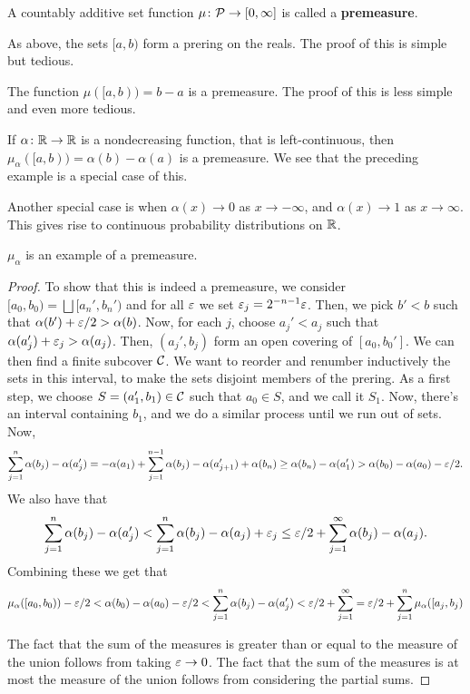 \begin{definition}
    A countably additive set function $\mu \colon \mathcal P \to [0, \infty]$ is called a \textbf{premeasure}.
\end{definition}

\begin{example}
    As above, the sets $[a, b)$ form a prering on the reals. The proof of this is simple but tedious.

    The function $\mu([a, b)) = b - a$ is a premeasure. The proof of this is less simple and even more tedious.
\end{example}

\begin{example}
    If $\alpha \colon \mathbb R \to \mathbb R$ is a nondecreasing function, that is left-continuous, then $\mu_\alpha([a, b)) = \alpha(b) - \alpha(a)$ is a premeasure. We see that the preceding example is a special case of this.

    Another special case is when $\alpha(x) \to 0$ as $x \to -\infty$, and $\alpha(x) \to 1$ as $x \to \infty.$ This gives rise to continuous probability distributions on $\mathbb R$.
\end{example}

\begin{proposition}
    $\mu_\alpha$ is an example of a premeasure.
\end{proposition}

\begin{proof}
    To show that this is indeed a premeasure, we consider $[a_0, b_0) = \bigsqcup [a_n', b_n')$ and for all $\varepsilon$ we set $\varepsilon_j = 2^{-n - 1}\varepsilon$. Then, we pick $b' < b$ such that $\alpha(b') + \varepsilon/2 > \alpha(b)$. Now, for each $j$, choose $a_j' < a_j$ such that $\alpha(a_j') + \varepsilon_j > \alpha(a_j)$. Then, $(a_j', b_j)$ form an open covering of $[a_0, b_0']$. We can then find a finite subcover $\mathcal C$. We want to reorder and renumber inductively the sets in this interval, to make the sets disjoint members of the prering. As a first step, we choose $S = (a_1', b_1) \in \mathcal C$ such that $a_0 \in S$, and we call it $S_1$. Now, there's an interval containing $b_1$, and we do a similar process until we run out of sets. Now, \[\sum_{j = 1}^n \alpha(b_j) - \alpha(a_j') = -\alpha(a_1) + \sum_{j = 1}^{n - 1} \alpha(b_j) - \alpha(a_{j + 1}') + \alpha(b_n) \ge \alpha(b_n) - \alpha(a_1') > \alpha(b_0) - \alpha(a_0) - \varepsilon/2.\] We also have that \[\sum_{j = 1}^n \alpha(b_j) - \alpha(a_j') < \sum_{j = 1}^n \alpha(b_j) - \alpha(a_j) + \varepsilon_j  \le \varepsilon/2 + \sum_{j = 1}^\infty \alpha(b_j) - \alpha(a_j).\] Combining these we get that \[\mu_\alpha([a_0, b_0)) - \varepsilon/2 < \alpha(b_0) - \alpha(a_0) - \varepsilon/2< \sum_{j = 1}^n \alpha(b_j) - \alpha(a_j') < \varepsilon/2 +  \sum_{j = 1}^\infty = \varepsilon/2 + \sum_{j = 1}^n \mu_\alpha([a_j, b_j)\]

    The fact that the sum of the measures is greater than or equal to the measure of the union follows from taking $\varepsilon \to 0$. The fact that the sum of the measures is at most the measure of the union follows from considering the partial sums.
\end{proof}


